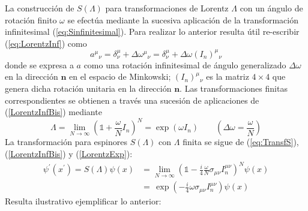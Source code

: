 La construcción de $S(\Lambda)$ para transformaciones de Lorentz $\Lambda$ con un ángulo de rotación finito $\omega$ se efectúa mediante la sucesiva aplicación de la transformación infinitesimal (\ref{eq:Sinfinitesimal}). Para realizar lo anterior resulta útil re-escribir (\ref{eq:LorentzInf}) como
\begin{equation}\label{LorentzInfBis}
a^{\mu}{}_{\nu}=\delta^{\mu}_{\nu}+\Delta \omega^{\mu}{}_{\nu}=\delta^{\mu}_{\nu}+\Delta \omega (I_n)^{\mu}{}_{\nu}
\end{equation}
donde se expresa a $a$ como una rotación infinitesimal de ángulo generalizado $\Delta \omega$ en la dirección $\bm{n}$ en el espacio de Minkowski; $(I_n)^{\mu}{}_{\nu}$ es la matriz $4\times 4$ que genera dicha rotación unitaria en la dirección $\bm{n}$. Las transformaciones finitas correspondientes se obtienen a través una sucesión de aplicaciones de (\ref{LorentzInfBis}) mediante
\begin{equation}\label{LorentzExp}
\Lambda = \lim_{N\rightarrow \infty}\left( \mathbb{1}+\frac{\omega}{N}I_n\right)^N= \exp{\left(\omega I_n\right)} \qquad \left(\Delta \omega = \frac{\omega}{N}\right)
\end{equation}
La transformación para espinores $S(\Lambda)$ con $\Lambda$ finita se sigue de (\ref{eq:TransfS}), (\ref{LorentzInfBis}) y (\ref{LorentzExp}):
\begin{equation}\label{eq:SFinita}
\begin{aligned}
\psi^{\prime}(x^{\prime})=S(\Lambda)\psi(x)&=\lim_{N\rightarrow \infty}\left( \mathbb{1}-\frac{i}{4}\frac{\omega}{N}\sigma_{\mu \nu}I_{n}^{\mu \nu}\right)^N \psi(x)\\
&=\,\exp{\left( -\frac{i}{4}\omega\sigma_{\mu \nu}I_{n}^{\mu \nu} \right)} \psi(x)
\end{aligned}
\end{equation}
Resulta ilustrativo ejemplificar lo anterior:
